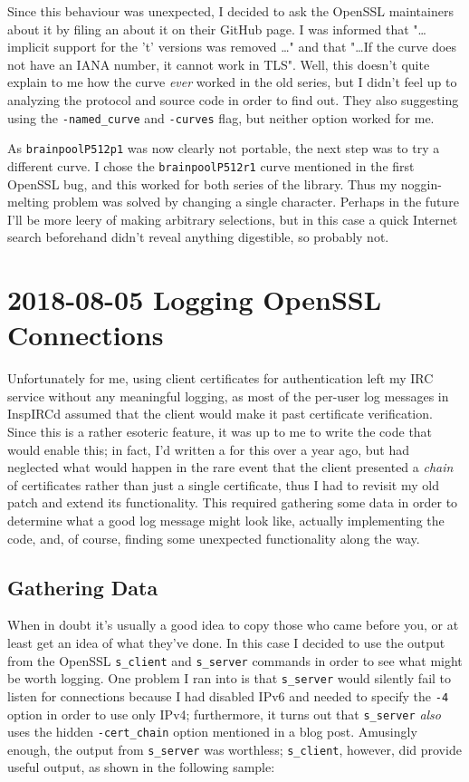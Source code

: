 \documentclass{article}
\begin{document}
Since this behaviour was unexpected, I decided to ask the OpenSSL maintainers about it by filing an  about it on their GitHub page.  I was informed that "\ldots implicit support for the 't' versions was removed \ldots" and that "\ldots If the curve does not have an IANA number, it cannot work in TLS".  Well, this doesn't quite explain to me how the curve \emph{ever} worked in the old series, but I didn't feel up to analyzing the protocol and source code in order to find out.  They also suggesting using the \texttt{-named_curve} and \texttt{-curves} flag, but neither option worked for me.

As \texttt{brainpoolP512p1} was now clearly not portable, the next step was to try a different curve.  I chose the \texttt{brainpoolP512r1} curve mentioned in the first OpenSSL bug, and this worked for both series of the library.  Thus my noggin-melting problem was solved by changing a single character.  Perhaps in the future I'll be more leery of making arbitrary selections, but in this case a quick Internet search beforehand didn't reveal anything digestible, so probably not.


\section{2018-08-05 Logging OpenSSL Connections}
Unfortunately for me, using client certificates for authentication left my IRC service without any meaningful logging, as most of the per-user log messages in InspIRCd assumed that the client would make it past certificate verification.  Since this is a rather esoteric feature, it was up to me to write the code that would enable this; in fact, I'd written a  for this over a year ago, but had neglected what would happen in the rare event that the client presented a \emph{chain} of certificates rather than just a single certificate, thus I had to revisit my old patch and extend its functionality.  This required gathering some data in order to determine what a good log message might look like, actually implementing the code, and, of course, finding some unexpected functionality along the way.

\subsection{Gathering Data}
When in doubt it's usually a good idea to copy those who came before you, or at least get an idea of what they've done.  In this case I decided to use the output from the OpenSSL \texttt{s_client} and \texttt{s_server} commands in order to see what might be worth logging.  One problem I ran into is that \texttt{s_server} would silently fail to listen for connections because I had disabled IPv6 and needed to specify the \texttt{-4} option in order to use only IPv4; furthermore, it turns out that \texttt{s_server} \emph{also} uses the hidden \texttt{-cert_chain} option mentioned in a  blog post.  Amusingly enough, the output from \texttt{s_server} was worthless; \texttt{s_client}, however, did provide useful output, as shown in the following sample:
\end{document}
